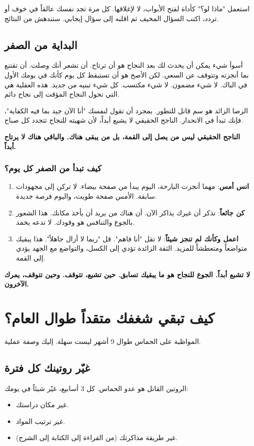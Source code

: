 \documentclass[12pt,a4paper]{book}
\newcommand{\importantAr}[1]{%
	\begin{important}
		\bfseries #1
	\end{important}
}
\begin{document}
	استعمل "ماذا لو؟" كأداة لفتح الأبواب، لا لإغلاقها. كل مرة تجد نفسك عالقاً في خوف أو تردد، اكتب السؤال المخيف ثم اقلبه إلى سؤال إيجابي. ستندهش من النتائج.
	
	\subsection{البداية من الصفر}
	\label{subsec:start-from-zero}
	
	أسوأ شيء يمكن أن يحدث لك بعد النجاح هو أن ترتاح. أن تشعر أنك وصلت. أن تقتنع بما أنجزته وتتوقف عن السعي. لكن الأصح هو أن تستيقظ كل يوم كأنك في يومك الأول في الباك. لا شيء مضمون. لا شيء مكتسب. كل شيء تبنيه من جديد. هذه العقلية هي التي تحول النجاح المؤقت إلى نجاح دائم.
	
	الرضا الزائد هو سم قاتل للتطور. بمجرد أن تقول لنفسك "أنا الآن جيد بما فيه الكفاية"، فإنك تبدأ في الانحدار. الناجح الحقيقي لا يشبع أبداً، لأن شهيته للنجاح تتجدد كل صباح.
	
	\importantAr{الناجح الحقيقي ليس من يصل إلى القمة، بل من يبقى هناك. والباقي هناك لا يرتاح أبداً.}
	
	\subsubsection*{كيف تبدأ من الصفر كل يوم؟}
	
	\begin{enumerate}
		\item \textbf{انس أمس}: مهما أنجزت البارحة، اليوم يبدأ من صفحة بيضاء. لا تركن إلى مجهودات سابقة. الأمس صفحة طويت، واليوم فرصة جديدة.
		\item \textbf{كن جائعاً}: تذكر أن غيرك يذاكر الآن. أن هناك من يريد أن يأخذ مكانك. هذا الشعور بالجوع والتنافس هو وقودك. لا تدعه يخمد.
		\item \textbf{اعمل وكأنك لم تنجز شيئاً}: لا تقل "أنا فاهم". قل "ربما لا أزال جاهلاً". هذا يبقيك متواضعاً ومتعطشاً للمزيد. الثقة الزائدة تؤدي إلى الكسل، والتواضع مع الجهد يؤدي إلى القمة.
	\end{enumerate}
	
	\importantAr{لا تشبع أبداً. الجوع للنجاح هو ما يبقيك تسابق. حين تشبع، تتوقف. وحين تتوقف، يمرك الآخرون.}
	
	\section{كيف تبقي شغفك متقداً طوال العام؟}
	المواظبة على الحماس طوال 9 أشهر ليست سهلة. إليك وصفة عملية.
	
	\subsection{غيّر روتينك كل فترة}
	الروتين القاتل هو عدو الحماس. كل 3 أسابيع، غيّر شيئاً في يومك:
	\begin{itemize}
		\item غير مكان دراستك.
		\item غير ترتيب المواد.
		\item غير طريقة مذاكرتك (من القراءة إلى الكتابة إلى الشرح).
	\end{itemize}
	
\end{document}
